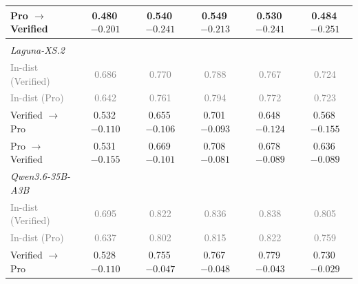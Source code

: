 \begin{table}[t]
\begin{tabular}{lccccc}
\qquad{}Pro $\rightarrow$ Verified & 0.480\,{\scriptsize \textcolor{red!70!black}{$-0.201$}} & 0.540\,{\scriptsize \textcolor{red!70!black}{$-0.241$}} & 0.549\,{\scriptsize \textcolor{red!70!black}{$-0.213$}} & 0.530\,{\scriptsize \textcolor{red!70!black}{$-0.241$}} & 0.484\,{\scriptsize \textcolor{red!70!black}{$-0.251$}}  \\
\midrule
\multicolumn{6}{l}{\textit{\Semantic{}}} \\
\quad{}\textit{Laguna-XS.2} \\
\qquad{}\textcolor{gray}{\small In-dist (Verified)} & \textcolor{gray}{\small 0.686} & \textcolor{gray}{\small 0.770} & \textcolor{gray}{\small 0.788} & \textcolor{gray}{\small 0.767} & \textcolor{gray}{\small 0.724} \\
\qquad{}\textcolor{gray}{\small In-dist (Pro)} & \textcolor{gray}{\small 0.642} & \textcolor{gray}{\small 0.761} & \textcolor{gray}{\small 0.794} & \textcolor{gray}{\small 0.772} & \textcolor{gray}{\small 0.723} \\
\qquad{}Verified $\rightarrow$ Pro & 0.532\,{\scriptsize \textcolor{red!70!black}{$-0.110$}} & 0.655\,{\scriptsize \textcolor{red!70!black}{$-0.106$}} & 0.701\,{\scriptsize \textcolor{red!70!black}{$-0.093$}} & 0.648\,{\scriptsize \textcolor{red!70!black}{$-0.124$}} & 0.568\,{\scriptsize \textcolor{red!70!black}{$-0.155$}}  \\
\qquad{}Pro $\rightarrow$ Verified & 0.531\,{\scriptsize \textcolor{red!70!black}{$-0.155$}} & 0.669\,{\scriptsize \textcolor{red!70!black}{$-0.101$}} & 0.708\,{\scriptsize \textcolor{red!70!black}{$-0.081$}} & 0.678\,{\scriptsize \textcolor{red!70!black}{$-0.089$}} & 0.636\,{\scriptsize \textcolor{red!70!black}{$-0.089$}}  \\
\quad{}\textit{Qwen3.6-35B-A3B} \\
\qquad{}\textcolor{gray}{\small In-dist (Verified)} & \textcolor{gray}{\small 0.695} & \textcolor{gray}{\small 0.822} & \textcolor{gray}{\small 0.836} & \textcolor{gray}{\small 0.838} & \textcolor{gray}{\small 0.805} \\
\qquad{}\textcolor{gray}{\small In-dist (Pro)} & \textcolor{gray}{\small 0.637} & \textcolor{gray}{\small 0.802} & \textcolor{gray}{\small 0.815} & \textcolor{gray}{\small 0.822} & \textcolor{gray}{\small 0.759} \\
\qquad{}Verified $\rightarrow$ Pro & 0.528\,{\scriptsize \textcolor{red!70!black}{$-0.110$}} & 0.755\,{\scriptsize \textcolor{red!70!black}{$-0.047$}} & 0.767\,{\scriptsize \textcolor{red!70!black}{$-0.048$}} & 0.779\,{\scriptsize \textcolor{red!70!black}{$-0.043$}} & 0.730\,{\scriptsize \textcolor{red!70!black}{$-0.029$}}  \\

\end{tabular}
\end{table}
